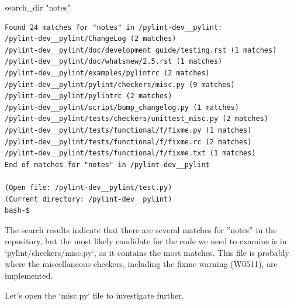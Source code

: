 {\begin{agentbox}
\hrulefill
\begin{CodeVerbatim}[breaklines=true, breakanywhere=true]
search_dir "notes"
\end{CodeVerbatim}
\end{agentbox}
\begin{observationbox}\begin{Verbatim}[breaklines=true, breakanywhere=true]
Found 24 matches for "notes" in /pylint-dev__pylint:
/pylint-dev__pylint/ChangeLog (2 matches)
/pylint-dev__pylint/doc/development_guide/testing.rst (1 matches)
/pylint-dev__pylint/doc/whatsnew/2.5.rst (1 matches)
/pylint-dev__pylint/examples/pylintrc (2 matches)
/pylint-dev__pylint/pylint/checkers/misc.py (9 matches)
/pylint-dev__pylint/pylintrc (2 matches)
/pylint-dev__pylint/script/bump_changelog.py (1 matches)
/pylint-dev__pylint/tests/checkers/unittest_misc.py (2 matches)
/pylint-dev__pylint/tests/functional/f/fixme.py (1 matches)
/pylint-dev__pylint/tests/functional/f/fixme.rc (2 matches)
/pylint-dev__pylint/tests/functional/f/fixme.txt (1 matches)
End of matches for "notes" in /pylint-dev__pylint

(Open file: /pylint-dev__pylint/test.py)
(Current directory: /pylint-dev__pylint)
bash-$
\end{Verbatim}
\end{observationbox}
\begin{agentbox}
The search results indicate that there are several matches for ''notes'' in the repository, but the most likely candidate for the code we need to examine is in `pylint/checkers/misc.py`, as it contains the most matches. This file is probably where the miscellaneous checkers, including the fixme warning (W0511), are implemented.



Let's open the `misc.py` file to investigate further.




\end{agentbox}}
